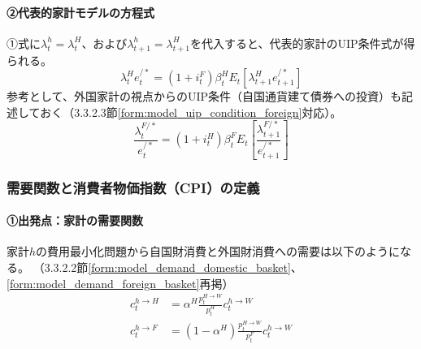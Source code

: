 \paragraph{②代表的家計モデルの方程式}\label{sec:chapter3_final_equations_utility_uip_ra_eq}
①式に\(\lambda_t^h=\lambda_t^H\)、および\(\lambda_{t+1}^h=\lambda_{t+1}^H\)を代入すると、代表的家計のUIP条件式が得られる。
\begin{equation}
\lambda_t^He_t^{/*}=(1+i_t^F)\beta_t^HE_t[\lambda_{t+1}^He_{t+1}^{/*}]
\label{form:model_final_equations_utility_uip_h}
\end{equation}
参考として、外国家計の視点からのUIP条件（自国通貨建て債券への投資）も記述しておく（3.3.2.3節\eqref{form:model_uip_condition_foreign}対応）。
\begin{equation}
\frac{\lambda_t^{F/*}}{e_t^{/*}}=(1+i_t^H)\beta_t^FE_t\left[\frac{\lambda_{t+1}^{F/*}}{e_{t+1}^{/*}}\right]
\label{form:model_final_equations_utility_uip_f}
\end{equation}

\subsubsection{需要関数と消費者物価指数（CPI）の定義}
\label{sec:chapter3_final_equations_utility_demand}
\paragraph{①出発点：家計の需要関数}\label{sec:chapter3_final_equations_utility_demand_origin}
家計\(h\)の費用最小化問題から自国財消費と外国財消費への需要は以下のようになる。
（3.3.2.2節\eqref{form:model_demand_domestic_basket}、\eqref{form:model_demand_foreign_basket}再掲）
\begin{align}
c_t^{h\to H}&=\alpha^H\frac{p_t^{H\to W}}{p_t^H}c_t^{h\to W} \label{form:model_final_equations_utility_demand_domestic_restated} \\
c_t^{h\to F}&=(1-\alpha^H)\frac{p_t^{H\to W}}{p_t^F}c_t^{h\to W} \label{form:model_final_equations_utility_demand_foreign_restated}
\end{align}

